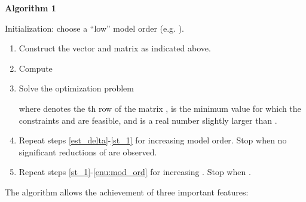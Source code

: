 \documentclass[twocolumn,english,journal]{IEEEtran}
\begin{document}
\textbf{Algorithm 1}\medskip{}


Initialization: choose a ``low'' model order (e.g. ).\medskip{}

\begin{enumerate}
\item \label{est_delta}Construct the vector  and
matrix  as indicated above.\medskip{}

\item \label{enu:eta}Compute


\item \label{st_1}Solve the optimization problem

where  denotes the th row of the matrix ,
 is the minimum value for which the constraints 
and  are feasible, and  is a real number slightly larger
than .\medskip{}

\item \label{enu:mod_ord}Repeat steps \ref{est_delta}-\ref{st_1} for
increasing model order. Stop when no significant reductions of 
are observed.\medskip{}

\item \label{enu:rho}Repeat steps \ref{st_1}-\ref{enu:mod_ord} for increasing
. Stop when .\medskip{}

\end{enumerate}
The algorithm allows the achievement of three important features:\medskip{}
\end{document}
